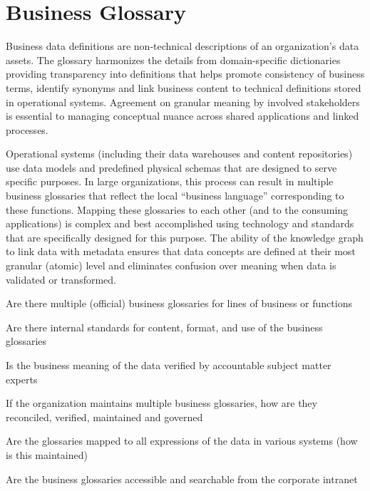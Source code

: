 \section{Business Glossary}\label{sec:ekgmm-b-2-4} %

Business data definitions are non-technical descriptions of an organization’s data assets.
The glossary harmonizes the details from domain-specific dictionaries providing transparency into definitions
that helps promote consistency of business terms, identify synonyms and link business content to technical
definitions stored in operational systems.
Agreement on granular meaning by involved stakeholders is essential to managing conceptual nuance across
shared applications and linked processes.

\ekgmmContextSection

Operational systems (including their data warehouses and content repositories) use data models and predefined
physical schemas that are designed to serve specific purposes.
In large organizations, this process can result in multiple business glossaries that reflect the
local “business language” corresponding to these functions.
Mapping these glossaries to each other (and to the consuming applications) is complex and best accomplished
using technology and standards that are specifically designed for this purpose.
The ability of the knowledge graph to link data with metadata ensures that data concepts are defined at their
most granular (atomic) level and eliminates confusion over meaning when data is validated or transformed.

\kgmmcorequestionssection

\begin{core-questions}

  \item [\thesection.1] Are there multiple (official) business glossaries for lines of business or functions
  \item [\thesection.2] Are there internal standards for content, format, and use of the business glossaries
  \item [\thesection.3] Is the business meaning of the data verified by accountable subject matter experts
  \item [\thesection.4] If the organization maintains multiple business glossaries, how are they reconciled,
                        verified, maintained and governed
  \item [\thesection.5] Are the glossaries mapped to all expressions of the data in various systems
                        (how is this maintained)
  \item [\thesection.4] Are the business glossaries accessible and searchable from the corporate intranet

\end{core-questions}

